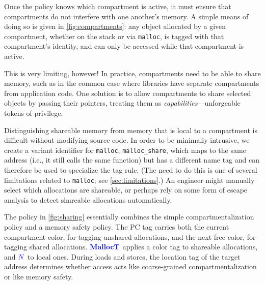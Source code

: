 \documentclass{llncs}
\begin{document}
Once the policy knows which compartment is active, it must ensure that compartments do not interfere with
one another's memory. A simple means of doing so is given in \cref{fig:compartments}: any object allocated by
a given compartment, whether on the stack or via {\tt malloc}, is tagged with that compartment's identity,
and can only be accessed while that compartment is active.

This is very limiting, however! In practice, compartments need to be able to share memory, such as in the
common case where libraries have separate compartments from application code. One solution is to allow
compartments to share selected objects by passing their pointers, treating them as
{\em capabilities}---unforgeable tokens of privilege.

Distinguishing shareable memory from memory that is local to a compartment is difficult
without modifying source code. In order to be minimally intrusive, we
create a variant identifier for {\tt malloc}, {\tt malloc\_share}, which maps to the same
address (i.e., it still calls the same function) but has a different name tag and can therefore
be used to specialize the tag rule. (The need to do this is one of several limitations related
to {\tt malloc}; see \cref{sec:limitations}.) An engineer might manually select which allocations are
shareable, or perhaps rely on some form of escape analysis to detect shareable allocations automatically.

The policy in \cref{fig:sharing} essentially combines the simple compartmentalization policy
and a memory safety policy. The PC tag carries both the current compartment color, for tagging
unshared allocations, and the next free color, for tagging shared allocations.
\(\color{blue} \mathbf{MallocT}\) applies a color tag to shareable allocations, and \({\color{blue} N}\) to local ones.
During loads and stores, the location tag of the target address
determines whether access acts like coarse-grained compartmentalization or like memory safety.
\end{document}

